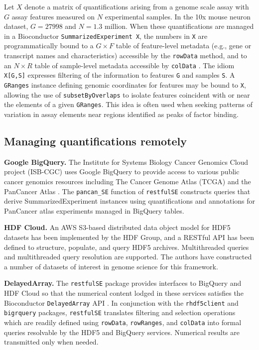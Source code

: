 \documentclass[applications]{gen-bioinformatics}
\begin{document}
Let $X$ denote a matrix of quantifications arising from a genome
scale assay with $G$ assay features measured on $N$ experimental
samples.  In the 10x mouse neuron dataset, $G = 27998$ and $N= 1.3$ million.
When these quantifications are managed in a Bioconductor \verb+SummarizedExperiment X+, the numbers in \verb+X+ are programmatically bound to a $G \times F$
table of feature-level metadata (e.g., gene or transcript names and
characteristics) accessible by the \verb+rowData+ method, and to an $N \times R$ table of sample-level metadata accessible by \verb+colData+ \citep{Huber2015}. 
The idiom \verb+X[G,S]+ expresses filtering of 
the information
to features \verb+G+ and samples \verb+S+.  A \verb+GRanges+ 
instance \citep{Lawrence2013} defining genomic coordinates for features may be bound to \verb+X+,
allowing the use of \verb+subsetByOverlaps+ to isolate features
coincident with or near the elements of a given \verb+GRanges+.
This idea is often used when seeking patterns of variation in
assay elements near regions identified as peaks of factor binding.

\subsection*{Managing quantifications remotely}

\noindent
\textbf{Google BigQuery.} The Institute for Systems Biology Cancer
Genomics Cloud project (ISB-CGC) \citep{ISBCGC} uses 
Google BigQuery to provide access to
various public cancer genomics resources including
The Cancer Genome Atlas (TCGA) and the PanCancer Atlas \citep{Hoadley2018}.
The \verb+pancan_SE+
function of \verb+restfulSE+ constructs queries that derive
SummarizedExperiment instances using quantifications and annotations
for PanCancer atlas experiments
managed in BigQuery tables.  

\noindent
\textbf{HDF Cloud.}  
An AWS S3-based distributed data object model for HDF5
datasets has been implemented by the HDF Group, and
a RESTful API has been defined to structure, populate,
and query HDF5 archives.  Multithreaded queries and
multithreaded query resolution are supported.
The authors have constructed a number of datasets of
interest in genome science for this framework.

\noindent
\textbf{DelayedArray.}
The \verb+restfulSE+ package provides interfaces to 
BigQuery and HDF Cloud so that 
the numerical content lodged in these services
satisfies the Bioconductor \verb+DelayedArray+ API \citep{Pages2018}.  
In conjunction with the \verb+rhdf5client+ and \verb+bigrquery+ packages,
\verb+restfulSE+ translates filtering and selection operations
which are readily defined using \verb+rowData+, \verb+rowRanges+,
and \verb+colData+ into formal queries resolvable by the HDF5 and
BigQuery services.  Numerical results are transmitted only when needed.
\end{document}
